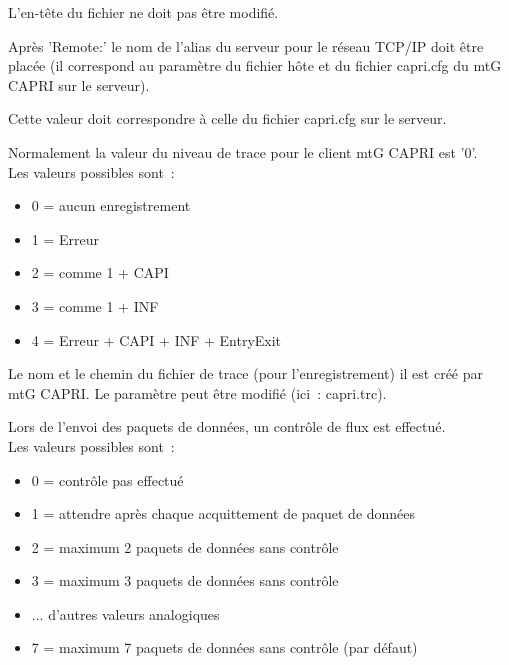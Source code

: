 \begin{description}

    L'en-tête du fichier ne doit pas être modifié.


    Après 'Remote:' le nom de l'alias du serveur pour le réseau TCP/IP doit être placée 
	 (il correspond au paramètre du fichier hôte et du fichier capri.cfg du mtG CAPRI sur le serveur).


    Cette valeur doit correspondre à celle du fichier capri.cfg sur le serveur.


    Normalement la valeur du niveau de trace pour le client mtG CAPRI est '0'. \\
	Les valeurs possibles sont~:
    \begin{itemize}
        \item 0 = aucun enregistrement
        \item 1 = Erreur
        \item 2 = comme 1 + CAPI
        \item 3 = comme 1 + INF
        \item 4 = Erreur + CAPI + INF + EntryExit
    \end{itemize}



    Le nom et le chemin du fichier de trace (pour l'enregistrement) il est créé par mtG CAPRI.
    Le paramètre peut être modifié (ici~: capri.trc).


    Lors de l'envoi des paquets de données, un contrôle de flux est effectué. \\
    Les valeurs possibles sont~: \\
    \begin{itemize}
        \item 0 = contrôle pas effectué
        \item 1 = attendre après chaque acquittement de paquet de données
        \item 2 = maximum 2 paquets de données sans contrôle
        \item 3 = maximum 3 paquets de données sans contrôle
        \item ... d'autres valeurs analogiques
        \item 7 = maximum 7 paquets de données sans contrôle (par défaut)
    \end{itemize}


\end{description}
